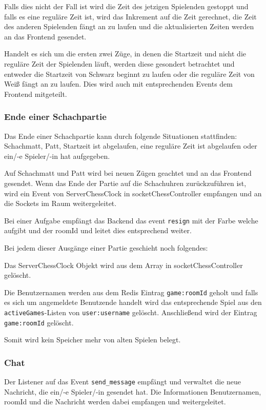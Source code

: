 Falls dies nicht der Fall ist wird die Zeit des jetzigen Spielenden gestoppt und falls es eine reguläre Zeit ist, wird das Inkrement auf die Zeit gerechnet, die Zeit des anderen Spielenden fängt an zu laufen und die aktualisierten Zeiten werden an das Frontend gesendet.

Handelt es sich um die ersten zwei Züge, in denen die Startzeit und nicht die reguläre Zeit der Spielenden läuft, werden diese gesondert betrachtet und entweder die Startzeit von Schwarz beginnt zu laufen oder die reguläre Zeit von Weiß fängt an zu laufen. Dies wird auch mit entsprechenden Events dem Frontend mitgeteilt.



\subsubsection{Ende einer Schachpartie}
\label{sec:Schach-Ende}
Das Ende einer Schachpartie kann durch folgende Situationen stattfinden:
Schachmatt, Patt, Startzeit ist abgelaufen, eine reguläre Zeit ist abgelaufen oder ein/-e Spieler/-in hat aufgegeben.

Auf Schachmatt und Patt wird bei neuen Zügen geachtet und an das Frontend gesendet. Wenn das Ende der Partie auf die Schachuhren zurückzuführen ist, wird ein Event von ServerChessClock in socketChessController empfangen und an die Sockets im Raum weitergeleitet. 

Bei einer Aufgabe empfängt das Backend das event \verb|resign| mit der Farbe welche aufgibt und der roomId und leitet dies entsprechend weiter.

Bei jedem dieser Ausgänge einer Partie geschieht noch folgendes:

Das ServerChessClock Objekt wird aus dem Array in socketChessController gelöscht.

Die Benutzernamen werden aus dem Redis Eintrag \verb|game:roomId| geholt und falls es sich um angemeldete Benutzende handelt wird das entsprechende Spiel aus den \verb|activeGames|-Listen von \verb|user:username| gelöscht. Anschließend wird der Eintrag \verb|game:roomId| gelöscht.

Somit wird kein Speicher mehr von alten Spielen belegt.

\subsubsection{Chat}
Der Listener auf das Event \verb|send_message| empfängt und verwaltet die neue Nachricht, die ein/-e Spieler/-in gesendet hat. Die Informationen Benutzernamen, roomId und die Nachricht werden dabei empfangen und weitergeleitet.

